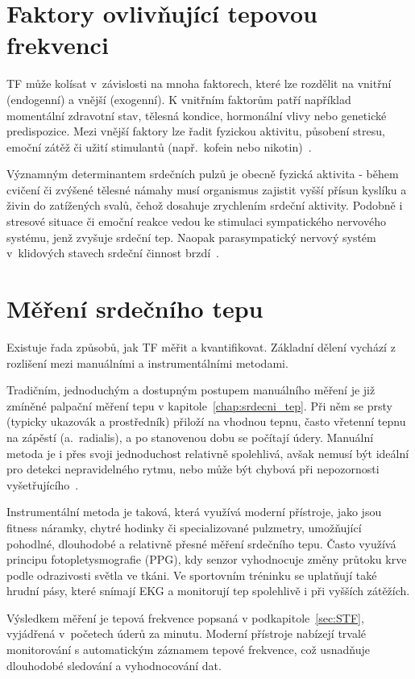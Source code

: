 \section{Faktory ovlivňující tepovou frekvenci}

\acs{TF} může kolísat v~závislosti na mnoha faktorech, které lze rozdělit na vnitřní (endogenní) a vnější (exogenní).
K vnitřním faktorům patří například momentální zdravotní stav, tělesná kondice, hormonální vlivy nebo genetické predispozice.
Mezi vnější faktory lze řadit fyzickou aktivitu, působení stresu, emoční zátěž či užití stimulantů (např.~kofein nebo nikotin)~\cite{faktoryOvlivnujiciTep}.

Významným determinantem srdečních pulzů je obecně fyzická aktivita - během cvičení či zvýšené tělesné námahy musí organismus zajistit vyšší přísun kyslíku a živin do zatížených svalů, čehož dosahuje zrychlením srdeční aktivity.
Podobně i stresové situace či emoční reakce vedou ke stimulaci sympatického nervového systému, jenž zvyšuje srdeční tep.
Naopak parasympatický nervový systém v~klidových stavech srdeční činnost brzdí~\cite{faktoryOvlivnujiciTep}.

\section{Měření srdečního tepu}

Existuje řada způsobů, jak \acs{TF} měřit a kvantifikovat.
Základní dělení vychází z rozlišení mezi manuálními a instrumentálními metodami.

Tradičním, jednoduchým a dostupným postupem manuálního měření je již zmíněné palpační měření tepu v kapitole~\ref{chap:srdecni_tep}.
Při něm se prsty (typicky ukazovák a prostředník) přiloží na vhodnou tepnu, často vřetenní tepnu na zápěstí (a.~radialis), a po stanovenou dobu se počítají údery.
Manuální metoda je i přes svoji jednoduchost relativně spolehlivá, avšak nemusí být ideální pro detekci nepravidelného rytmu, nebo může být chybová při nepozornosti vyšetřujícího~\cite{vnitrniLekarstviVKostce}.

Instrumentální metoda je taková, která využívá moderní přístroje, jako jsou fitness náramky, chytré hodinky či specializované pulzmetry, umožňující pohodlné, dlouhodobé a relativně přesné měření srdečního tepu.
Často využívá principu fotopletysmografie (PPG), kdy senzor vyhodnocuje změny průtoku krve podle odrazivosti světla ve tkáni.
Ve sportovním tréninku se uplatňují také hrudní pásy, které snímají EKG a monitorují tep spolehlivě i při vyšších zátěžích.

Výsledkem měření je tepová frekvence popsaná v podkapitole~\ref{sec:STF}, vyjádřená v~početech úderů za minutu.
Moderní přístroje nabízejí trvalé monitorování s automatickým záznamem tepové frekvence, což usnadňuje dlouhodobé sledování a vyhodnocování dat.
